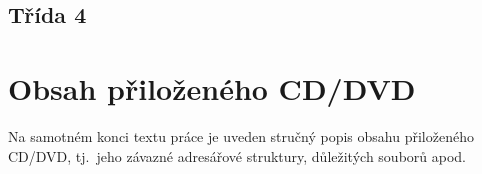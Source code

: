 \documentclass[
  biblatex,
  glossaries,
  index
]{kidiplom}
\begin{document}
\subsection{Třída 4}























































































\section{Obsah přiloženého CD/DVD} \label{sec:ObsahCD}

Na samotném konci textu práce je uveden stručný popis obsahu
přiloženého CD/DVD, tj.~jeho závazné adresářové struktury, důležitých
souborů apod.
\end{document}
